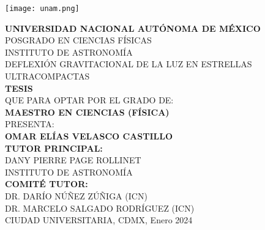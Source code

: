 \documentclass[letterpaper, twoside,openright]{book}
\begin{document}
	
\thispagestyle{empty}

\begin{figure*}
\centering
\texttt{[image: unam.png]}
\end{figure*}
\begin{center}
    \Large{\textbf{UNIVERSIDAD NACIONAL AUTÓNOMA DE MÉXICO}} \\
    \large{POSGRADO EN CIENCIAS FÍSICAS}\\
    \large{INSTITUTO DE ASTRONOMÍA} \\[1cm] 

	DEFLEXIÓN GRAVITACIONAL DE LA LUZ EN ESTRELLAS ULTRACOMPACTAS\\[1cm]

	\large{\textbf{TESIS}  }\\

	\large{QUE PARA OPTAR POR EL GRADO DE:}\\

	\large{\textbf{MAESTRO EN CIENCIAS (FÍSICA)} }\\[1cm]

	\large{PRESENTA:}\\

	\large{\textbf{OMAR ELÍAS VELASCO CASTILLO}  }\\[1cm]
  
	\large{\textbf{TUTOR PRINCIPAL:}}\\
	\large{DANY PIERRE PAGE ROLLINET}\\
	INSTITUTO DE ASTRONOMÍA\\[2cm]
	\large{\textbf{COMITÉ TUTOR:}}\\
	\large{DR. DARÍO NÚÑEZ ZÚÑIGA (ICN)}\\
	\large{DR. MARCELO SALGADO RODRÍGUEZ (ICN)}\\[2cm]
  
    \large{CIUDAD UNIVERSITARIA, CDMX, Enero 2024}
\end{center}

\newpage
\end{document}
